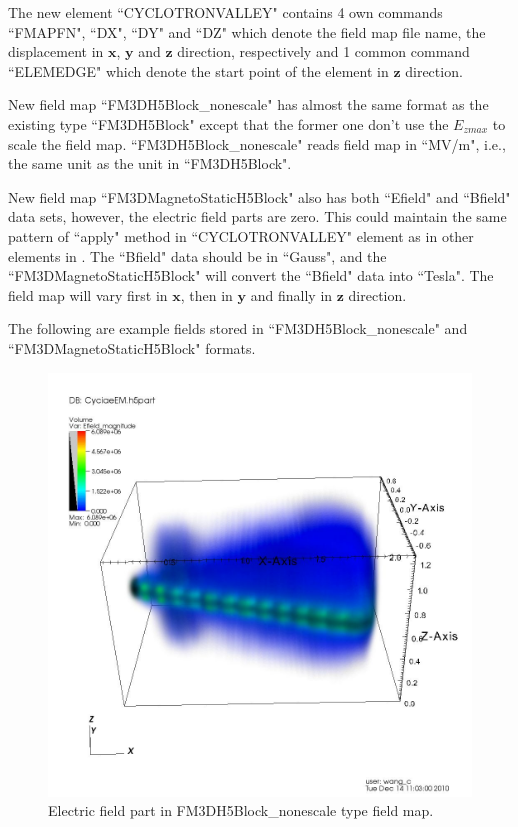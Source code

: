 \documentclass[a4paper,11pt]{article}
\begin{document}
\begin{appendices}
The new element ``CYCLOTRONVALLEY" contains 4 own commands ``FMAPFN", ``DX", ``DY" and ``DZ" which denote the field map file name, the displacement in $\mathbf{x}$, $\mathbf{y}$ and $\mathbf{z}$ direction, respectively and 1 common command ``ELEMEDGE" which denote the start point of the element in $\mathbf{z}$ direction.

New field map ``FM3DH5Block\_nonescale" has almost the same format as the existing type ``FM3DH5Block" except that the former one don't use the $E_{zmax}$ to scale the field map. ``FM3DH5Block\_nonescale" reads field map in ``MV/m", i.e., the same unit as the unit in ``FM3DH5Block".

New field map ``FM3DMagnetoStaticH5Block" also has both ``Efield" and ``Bfield" data sets, however, the electric field parts are zero. This could maintain the same pattern of ``apply" method in ``CYCLOTRONVALLEY" element as in other elements in \opal. The ``Bfield" data should be in ``Gauss", and the ``FM3DMagnetoStaticH5Block" will convert the ``Bfield" data into ``Tesla". The field map will vary first in $\mathbf{x}$, then in $\mathbf{y}$ and finally in $\mathbf{z}$ direction.

The following are example fields stored in ``FM3DH5Block\_nonescale" and ``FM3D\-MagnetoStaticH5Block" formats.

\begin{figure}[H]
\begin{center}
\includegraphics[width=1\textwidth]{visit0001.jpeg}
\end{center}
\caption{Electric field part in FM3DH5Block\_nonescale type field map.\label{fig:eme}}
\end{figure}


\end{appendices}
\end{document}
